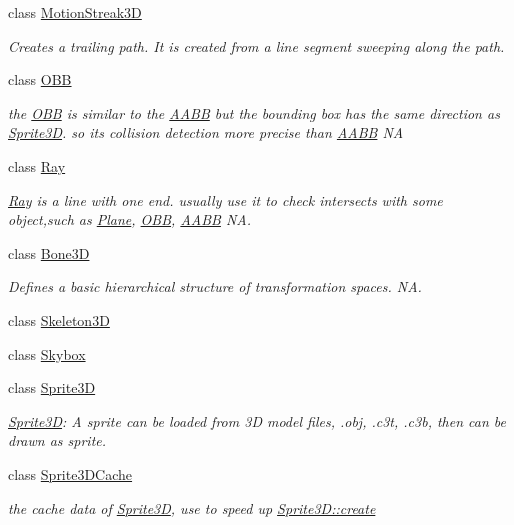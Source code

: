 \begin{DoxyCompactItemize}
class \hyperlink{classMotionStreak3D}{Motion\+Streak3D}
\begin{DoxyCompactList}\small\item\em Creates a trailing path. It is created from a line segment sweeping along the path. \end{DoxyCompactList}\item 
class \hyperlink{classOBB}{O\+BB}
\begin{DoxyCompactList}\small\item\em the \hyperlink{classOBB}{O\+BB} is similar to the \hyperlink{classAABB}{A\+A\+BB} but the bounding box has the same direction as \hyperlink{classSprite3D}{Sprite3D}. so it\textquotesingle{}s collision detection more precise than \hyperlink{classAABB}{A\+A\+BB}  NA \end{DoxyCompactList}\item 
class \hyperlink{classRay}{Ray}
\begin{DoxyCompactList}\small\item\em \hyperlink{classRay}{Ray} is a line with one end. usually use it to check intersects with some object,such as \hyperlink{classPlane}{Plane}, \hyperlink{classOBB}{O\+BB}, \hyperlink{classAABB}{A\+A\+BB}  NA. \end{DoxyCompactList}\item 
class \hyperlink{classBone3D}{Bone3D}
\begin{DoxyCompactList}\small\item\em Defines a basic hierarchical structure of transformation spaces.  NA. \end{DoxyCompactList}\item 
class \hyperlink{classSkeleton3D}{Skeleton3D}
\item 
class \hyperlink{classSkybox}{Skybox}
\item 
class \hyperlink{classSprite3D}{Sprite3D}
\begin{DoxyCompactList}\small\item\em \hyperlink{classSprite3D}{Sprite3D}\+: A sprite can be loaded from 3D model files, .obj, .c3t, .c3b, then can be drawn as sprite. \end{DoxyCompactList}\item 
class \hyperlink{classSprite3DCache}{Sprite3\+D\+Cache}
\begin{DoxyCompactList}\small\item\em the cache data of \hyperlink{classSprite3D}{Sprite3D}, use to speed up \hyperlink{classSprite3D_a10905e0480bfcf875882a9ad7b538d78}{Sprite3\+D\+::create} \end{DoxyCompactList}\item 

\end{DoxyCompactItemize}
